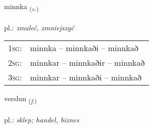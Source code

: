 \documentclass[frontgrid, backgrid]{flacards}\usepackage[]{graphicx}\usepackage[]{xcolor}
\begin{document}
\renewcommand{\flhead}{\vskip5pt \fboxsep=0pt {\small\bfseries\footnotesize Sagnorð | Verb}}
\renewcommand{\fcfoot}{\vskip5pt \fboxsep=0pt \hspace{2pt}{\small\bfseries\footnotesize 1K}}

\renewcommand{\blhead}{\vskip5pt {\small\bfseries\footnotesize Sagnorð | Verb }}
\renewcommand{\bcfoot}{\vskip5pt \hspace{2pt}{\small\bfseries\footnotesize 1K}}


{minnka \small{\textsubscript{(\textit{v.})}} \\[1ex] %
\textphonetic{[miŋ̥ka]} \\
pl.: \emph{zmaleć, zmniejszyć} \\  [2ex]
\renewcommand*{\arraystretch}{0.8}
\begin{tabular}{p{1cm}l}
\textsc{1sg}: & minnka -- minnkaði -- minnkað \\ 
\textsc{2sg}: & minnkar -- minnkaðir -- minnkað \\ 
\textsc{3sg}: & minnkar -- minnkaði -- minnkað \\ 
\end{tabular}
}

\renewcommand{\flhead}{\vskip5pt \fboxsep=0pt {\small\bfseries\footnotesize Nafnorð | Noun}}
\renewcommand{\fcfoot}{\vskip5pt \fboxsep=0pt \hspace{2pt}{\small\bfseries\footnotesize 1K}}

\renewcommand{\blhead}{\vskip5pt {\small\bfseries\footnotesize Nafnorð | Noun }}
\renewcommand{\bcfoot}{\vskip5pt \hspace{2pt}{\small\bfseries\footnotesize 1K}}


{verslun \small{\textsubscript{(\textit{f.})}} \\[1ex] %
 \\
pl.: \emph{sklep; handel, biznes} \\  [2ex]
\renewcommand*{\arraystretch}{0.8}
}
\end{document}

